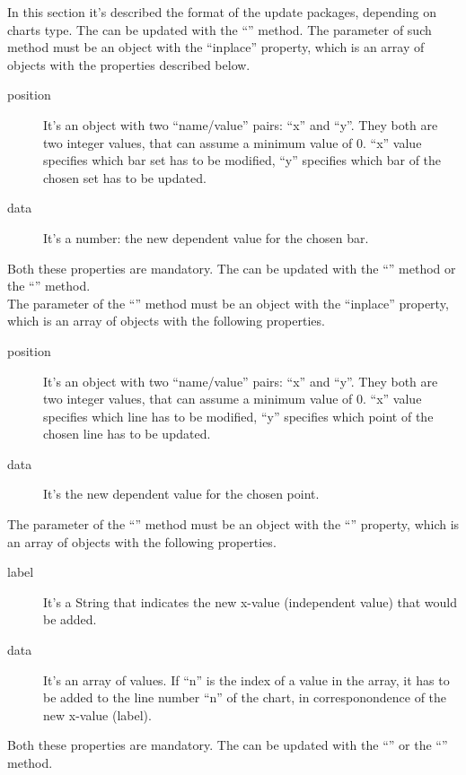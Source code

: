 			In this section it's described the format of the update packages, depending on charts type. 
				The  can be updated with the “” method. The parameter of such method must be an object with the “inplace” property, which is an array of objects with the properties described below.
				\begin{description}
					\item[position] It's an object with two “name/value” pairs: “x” and “y”. They both are two integer values, that can assume a minimum value of 0. “x” value specifies which bar set has to be modified, “y” specifies which bar of the chosen set has to be updated.
					\item[data] It's a number: the new dependent value for the chosen bar.
				\end{description}
				Both these properties are mandatory.
				The  can be updated with the “” method or the “” method.\\
				The parameter of the “” method must be an object with the “inplace” property, which is an array of objects with the following properties.
				\begin{description}
					\item[position] It's an object with two “name/value” pairs: “x” and “y”. They both are two integer values, that can assume a minimum value of 0. “x” value specifies which line has to be modified, “y” specifies which point of the chosen line has to be updated.
					\item[data] It's the new dependent value for the chosen point.
				\end{description}
				The parameter of the “” method must be an object with the “” property, which is an array of objects with the following properties.
				\begin{description}
					\item[label] It's a String that indicates the new x-value (independent value) that would be added.
					\item[data] It's an array of values. If “n” is the index of a value in the array, it has to be added to the line number “n” of the chart, in corresponondence of the new x-value (label).
				\end{description}
				Both these properties are mandatory.
				The  can be updated with the “” or the “” method.\\
